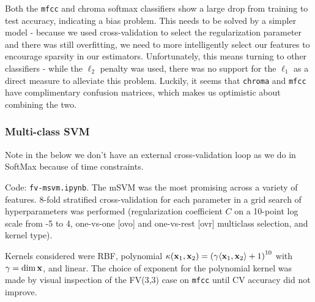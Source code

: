 \documentclass[9pt]{article}
\begin{document}
Both the \texttt{mfcc} and chroma softmax classifiers show a large drop from training to test accuracy, indicating a bias problem. This needs to be solved by a simpler model - because we used cross-validation to select the regularization parameter and there was still overfitting, we need to more intelligently select our features to encourage sparsity in our estimators. Unfortunately, this means turning to other classifiers - while the $\ell_2$ penalty was used, there was no support for the $\ell_1$ as a direct measure to alleviate this problem.
Luckily, it seems that \texttt{chroma} and \texttt{mfcc} have complimentary confusion matrices, which makes us optimistic about combining the two.

\subsubsection{Multi-class SVM}

Note in the below we don't have an external cross-validation loop as we do in SoftMax because of time constraints.

Code: \texttt{fv-msvm.ipynb}. The mSVM was the most promising across a variety of features. 8-fold stratified cross-validation for each parameter in a grid search of hyperparameters was performed (regularization coefficient $C$ on a 10-point log scale from -5 to 4, one-vs-one [ovo] and one-vs-rest [ovr] multiclass selection, and kernel type).

Kernels considered were RBF, polynomial $\kappa(\textbf{x}_1, \textbf{x}_2)=\left({\gamma\langle \textbf{x}_1,\textbf{x}_2 \rangle+1}\right)^{10}$ with $\gamma=\dim \textbf{x}$, and linear. The choice of exponent for the polynomial kernel was made by visual inspection of the FV(3,3) case on \texttt{mfcc} until CV accuracy did not improve.
\end{document}
